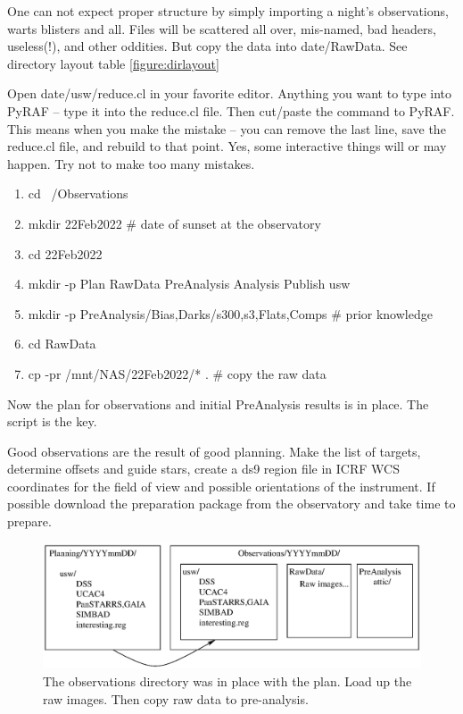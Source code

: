 \documentclass[letter,11pt,oneside]{article}
\newcommand{\dhl}[1]{{\color{verbcolor}{\texttt#1}}}
\begin{document}
One can not expect proper structure by simply importing a night's
observations, warts blisters and all. Files will be scattered all
over, mis-named, bad headers, useless(!), and other oddities. But copy
the data into date/RawData. See directory layout table \ref{figure:dirlayout}

Open date/usw/reduce.cl in your favorite editor. Anything you want
to type into PyRAF -- type it into the reduce.cl file. Then cut/paste
the command to PyRAF. This means when you make the mistake -- you
can remove the last line, save the reduce.cl file, and rebuild
to that point. Yes, some interactive things will or may happen.
Try not to make too many mistakes.

\vspace{-.15cm}
\begin{enumerate}\addtolength{\itemsep}{-0.5\baselineskip}
   \item   cd ~/Observations
   \item   mkdir 22Feb2022 \# date of sunset at the observatory
   \item   cd 22Feb2022
   \item   mkdir -p Plan RawData PreAnalysis Analysis Publish usw
   \item   mkdir -p PreAnalysis/{Bias,Darks/{s300,s3},Flats,Comps} \# prior knowledge
   \item   cd RawData
   \item   cp -pr /mnt/NAS/22Feb2022/* .  \# copy the raw data
\end{enumerate}

Now the plan for observations and initial PreAnalysis results is in 
place. The \dhl{usw/reduce.cl} script is the key. 

Good observations are the result of good planning. Make the list of targets,
determine offsets and guide stars, create a ds9 region file in ICRF WCS
coordinates for the field of view and possible orientations of the instrument.
If possible download the preparation package from the observatory and take
time to prepare. 

\begin{figure}[h!]
\centering
\includegraphics[width=.4\textwidth]{images/Overview.eps}
\caption{The observations directory was in place with the plan.
Load up the raw images. Then copy raw data to pre-analysis.} %
\label{figure:GoalsOverview}
\end{figure}
\end{document}

